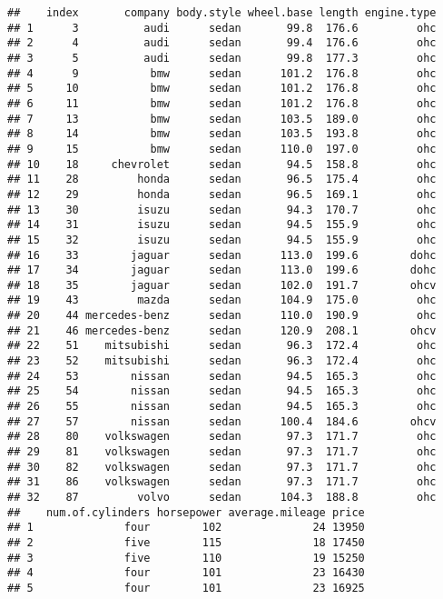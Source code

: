 \documentclass[
]{article}
\begin{document}
\begin{verbatim}
##    index       company body.style wheel.base length engine.type
## 1      3          audi      sedan       99.8  176.6         ohc
## 2      4          audi      sedan       99.4  176.6         ohc
## 3      5          audi      sedan       99.8  177.3         ohc
## 4      9           bmw      sedan      101.2  176.8         ohc
## 5     10           bmw      sedan      101.2  176.8         ohc
## 6     11           bmw      sedan      101.2  176.8         ohc
## 7     13           bmw      sedan      103.5  189.0         ohc
## 8     14           bmw      sedan      103.5  193.8         ohc
## 9     15           bmw      sedan      110.0  197.0         ohc
## 10    18     chevrolet      sedan       94.5  158.8         ohc
## 11    28         honda      sedan       96.5  175.4         ohc
## 12    29         honda      sedan       96.5  169.1         ohc
## 13    30         isuzu      sedan       94.3  170.7         ohc
## 14    31         isuzu      sedan       94.5  155.9         ohc
## 15    32         isuzu      sedan       94.5  155.9         ohc
## 16    33        jaguar      sedan      113.0  199.6        dohc
## 17    34        jaguar      sedan      113.0  199.6        dohc
## 18    35        jaguar      sedan      102.0  191.7        ohcv
## 19    43         mazda      sedan      104.9  175.0         ohc
## 20    44 mercedes-benz      sedan      110.0  190.9         ohc
## 21    46 mercedes-benz      sedan      120.9  208.1        ohcv
## 22    51    mitsubishi      sedan       96.3  172.4         ohc
## 23    52    mitsubishi      sedan       96.3  172.4         ohc
## 24    53        nissan      sedan       94.5  165.3         ohc
## 25    54        nissan      sedan       94.5  165.3         ohc
## 26    55        nissan      sedan       94.5  165.3         ohc
## 27    57        nissan      sedan      100.4  184.6        ohcv
## 28    80    volkswagen      sedan       97.3  171.7         ohc
## 29    81    volkswagen      sedan       97.3  171.7         ohc
## 30    82    volkswagen      sedan       97.3  171.7         ohc
## 31    86    volkswagen      sedan       97.3  171.7         ohc
## 32    87         volvo      sedan      104.3  188.8         ohc
##    num.of.cylinders horsepower average.mileage price
## 1              four        102              24 13950
## 2              five        115              18 17450
## 3              five        110              19 15250
## 4              four        101              23 16430
## 5              four        101              23 16925

\end{verbatim}
\end{document}
